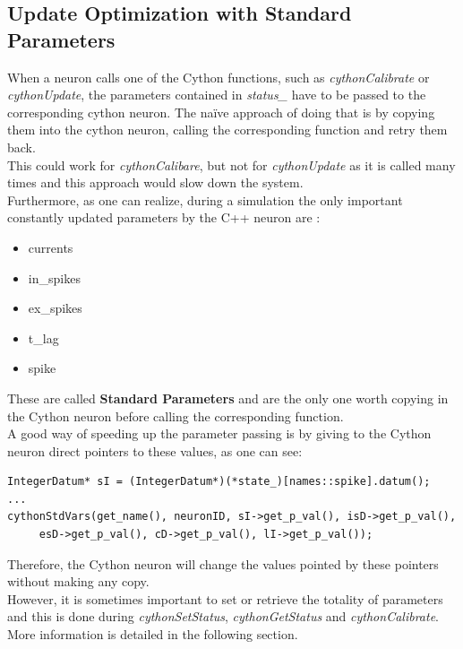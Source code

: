 \documentclass{article}
\begin{document}
\subsection{Update Optimization with Standard Parameters}
When a neuron calls one of the Cython functions, such as \emph{cythonCalibrate} or \emph{cythonUpdate}, the parameters contained in \emph{status\_} have to be passed to the corresponding cython neuron. The naïve approach of doing that is by copying them into the cython neuron, calling the corresponding function and retry them back.\\
This could work for \emph{cythonCalibare}, but not for \emph{cythonUpdate} as it is called many times and this approach would slow down the system. \\
Furthermore, as one can realize, during a simulation the only important constantly updated parameters by the C++ neuron are :\\
\begin{itemize}
\item currents
\item in\_spikes
\item ex\_spikes
\item t\_lag
\item spike
\end{itemize}
These are called \textbf{Standard Parameters} and are the only one worth copying in the Cython neuron before calling the corresponding function.\\
A good way of speeding up the parameter passing is by giving to the Cython neuron direct pointers to these values, as one can see:
\begin{verbatim}
IntegerDatum* sI = (IntegerDatum*)(*state_)[names::spike].datum();
...
cythonStdVars(get_name(), neuronID, sI->get_p_val(), isD->get_p_val(), 
     esD->get_p_val(), cD->get_p_val(), lI->get_p_val());
\end{verbatim}
Therefore, the Cython neuron will change the values pointed by these pointers without making any copy.\\
However, it is sometimes important to set or retrieve the totality of parameters and this is done during \emph{cythonSetStatus}, \emph{cythonGetStatus} and \emph{cythonCalibrate}.
More information is detailed in the following section.
\end{document}
